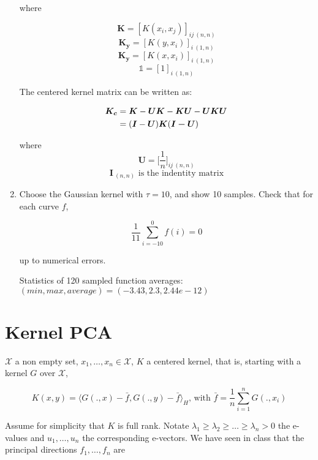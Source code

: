 \documentclass{article}
\begin{document}
\begin{enumerate}
        where  
        
        \[\bm{K} = [K(x_i,x_j)]_{ij\ (n,n)}\] 
        \[\bm{K_y} = [K(y,x_i)]_{i\ (1,n)}\]
        \[\bm{K_y} = [K(x,x_i)]_{i\ (1,n)}\]
        \[\mathbb{1} = [1]_{i\ (1,n)}\]
        
        The centered kernel matrix can be written as: 
        
        \begin{equation} 
            \begin{aligned}
                \bm{K_c} &= \bm{K} - \bm{UK} - \bm{KU} - \bm{UKU} \\
                &= (\bm{I} - \bm{U})\bm{K}(\bm{I-U}) \notag
            \end{aligned}
        \end{equation}

        where 
        \[\bm{U} = \bigg[\frac{1}{n}\bigg]_{ij\ (n,n)}\]
        \[\bm{I}_{\ (n,n)} \mbox{ is the indentity matrix}\]

    \item Choose the Gaussian kernel with $\tau=10$, and show 10 samples. Check that for each curve $f$, 
        
        \begin{equation}
            \frac{1}{11}\sum_{i=-10}^0 f(i)=0
        \end{equation}
        
        up to numerical errors.  

        Statistics of 120 sampled function averages: $(min, max, average) = (-3.43, 2.3, 2.44e-12)$


\end{enumerate}


\section{Kernel PCA}

$\mathcal{X}$ a non empty set, $x_1,\ldots,x_n \in \mathcal{X}$, $K$ a centered kernel, that is, starting with a kernel $G$ over $\mathcal{X}$, 

\[K(x,y)=\langle G(.,x)- \bar{f}, G(.,y)-\bar{f}\rangle_H \mbox{, with } \bar{f}=\frac{1}{n}\sum_{i=1}^n G(.,x_i)\]
    
Assume for simplicity that $K$ is full rank. Notate $\lambda_1 \geq \lambda_2 \geq \ldots \geq \lambda_n>0$ the e-values and $u_1,\ldots,u_n$ the corresponding e-vectors. 
We have seen in class that the principal directions $f_1,\ldots,f_n$ are 
\end{document}
